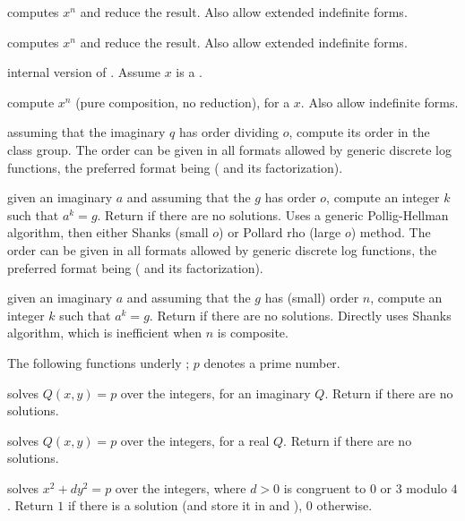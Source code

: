
 computes $x^n$ and reduce the result. Also
allow extended indefinite forms.

 computes $x^n$ and reduce the result. Also
allow extended indefinite forms.

 internal version of . Assume
$x$ is a .

 compute $x^n$ (pure composition, no
reduction), for a  $x$. Also allow indefinite forms.


assuming that the imaginary  $q$ has order dividing $o$, compute its
order in the class group. The order can be given in all formats allowed by
generic discrete log functions, the preferred format being \kbd{[ord, fa]}
( and its factorization).

 given an imaginary  $a$ and
assuming
that the  $g$ has order $o$, compute an integer $k$ such that $a^k =
g$. Return  if there are no solutions. Uses a generic
Pollig-Hellman algorithm, then either Shanks (small $o$) or Pollard rho
(large $o$) method. The order can be given in all formats allowed by generic
discrete log functions, the preferred format being \kbd{[ord, fa]}
( and its factorization).

 given an imaginary  $a$ and
assuming that the  $g$ has (small) order $n$, compute an integer $k$
such that $a^k = g$. Return  if there are no solutions.
Directly uses Shanks algorithm, which is inefficient when $n$ is composite.


The following functions underly ; $p$ denotes a prime number.

 solves $Q(x,y) = p$ over the integers, for
an imaginary  $Q$. Return  if there are no solutions.

 solves $Q(x,y) = p$ over the integers, for
a real  $Q$. Return  if there are no solutions.

 solves
$x^2+ dy^2 = p$ over the integers, where $d > 0$ is congruent to $0$ or $3$
modulo $4$. Return $1$ if there is a
solution (and store it in  and ), $0$ otherwise.


